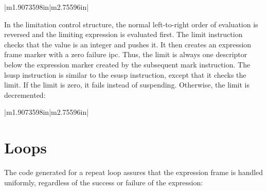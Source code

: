 \begin{center}
\tablelasttail{\hline}
\begin{xtabular}{|m{1.9073598in}|m{2.75596in}|}

\end{xtabular}
\end{center}

In the limitation control structure, the normal left-to-right order of
evaluation is reversed and the limiting expression is evaluated
first. The limit instruction checks that the value is an integer and
pushes it. It then creates an expression frame marker with a zero
failure ipc. Thus, the limit is always one descriptor below the
expression marker created by the subsequent mark instruction. The
lsusp instruction is similar to the esusp instruction, except that it
checks the limit. If the limit is zero, it fails instead of
suspending. Otherwise, the limit is decremented:

\begin{center}
\tablelasttail{\hline}
\begin{xtabular}{|m{1.9073598in}|m{2.75596in}|}

\end{xtabular}
\end{center}


\section{Loops}

The code generated for a repeat loop assures that the expression frame
is handled uniformly, regardless of the success or failure of the
expression:

